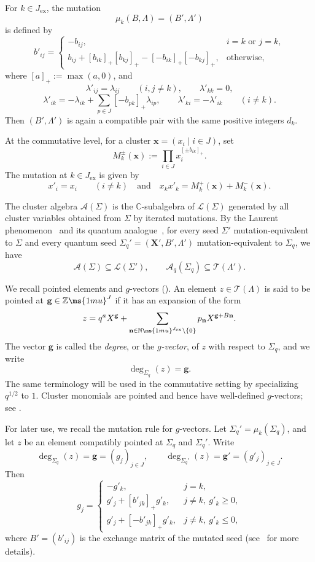 \documentclass[12pt, leqno]{amsart}
\numberwithin{equation}{section}
\theoremstyle{plain}
\theoremstyle{definition}
\newcommand{\seteq}{\mathbin{:=}}
\newcommand{\ex}{\mathrm{ex}}
\newcommand{\C}{\mathbb{C}}
\newcommand{\Z}{\mathbb{Z}\ms{1mu}}
\newcommand{\N}{\mathbb{N}\ms{1mu}}
\newcommand{\bfX}{\mathbf{X}}
\newcommand{\bfg}{\mathbf{g}}
\newcommand{\bfn}{\mathbf{n}}
\newcommand{\bfx}{\mathbf{x}}
\newcommand{\calA}{\mathcal{A}}
\newcommand{\calL}{\mathcal{L}}
\newcommand{\calT}{\mathcal{T}}
\newcommand{\qtq}[1][{and}]{\quad\text{{#1}}\quad}
\begin{document}
For $k\in J_{\ex}$, the mutation
\[
\mu_k(B,\Lambda)=(B',\Lambda')
\]
is defined by
\[
b'_{ij} =
\begin{cases}
-b_{ij}, & i=k \text{ or } j=k,\\
b_{ij}+[b_{ik}]_+[b_{kj}]_+ -[-b_{ik}]_+[-b_{kj}]_+, & \text{otherwise},
\end{cases}
\]
where $[a]_+\seteq\max(a,0)$, and
\[
\lambda'_{ij}=\lambda_{ij}\qquad(i,j\neq k),
\qquad\lambda'_{kk}=0,
\]
\[
\lambda'_{ik} = -\lambda_{ik} +\sum_{p\in J}[-b_{pk}]_+\lambda_{ip}, \qquad \lambda'_{ki}=-\lambda'_{ik}\qquad(i\neq k).
\]
Then $(B',\Lambda')$ is again a compatible pair with  the same positive integers $d_k$.

At the commutative level, for a cluster
$\bfx=(x_i\mid i\in J)$, set
\[
M_k^\pm(\bfx) \seteq \prod_{i\in J}x_i^{[\pm b_{ik}]_+}.
\]
The mutation at $k\in J_{\ex}$ is given by
\[
x'_i=x_i\qquad(i\neq k) \qtq x_kx'_k=M_k^+(\bfx)+M_k^-(\bfx).
\]

The cluster algebra $\calA(\Sigma)$ is the $\C$-subalgebra of
$\calL(\Sigma)$ generated by all cluster variables obtained from
$\Sigma$ by iterated mutations. By the Laurent phenomenon~\cite{FZ02}
and its quantum analogue~\cite{BZ05}, for every seed $\Sigma'$ mutation-equivalent
to $\Sigma$ and every quantum seed
$\Sigma_q'=(\bfX',B',\Lambda')$ mutation-equivalent to $\Sigma_q$, we have
\[
\calA(\Sigma)\subseteq\calL(\Sigma'),   \qquad   \calA_q(\Sigma_q)\subseteq\calT(\Lambda').
\]

We recall pointed elements and $g$-vectors (\cite{FZ07,Qin17}). An element
$z\in\calT(\Lambda)$ is said to be pointed at
$\bfg\in\Z^J$ if it has an expansion of the form
\begin{equation}\label{eq: pointed element}
z = q^a X^{\bfg} + \sum_{\bfn\in\N^{J_{\ex}}\setminus\{0\}} p_{\bfn}X^{\bfg+B\bfn}.
\end{equation}
The vector $\bfg$ is called the \emph{degree}, or the
\emph{$g$-vector}, of $z$ with respect to $\Sigma_q$,
and we write
\[
\deg_{\Sigma_q}(z)=\bfg.
\]
The same terminology will be used in the commutative setting by
specializing $q^{1/2}$ to $1$. Cluster monomials are pointed and hence
have well-defined $g$-vectors; see \cite[\S 5]{GHKK18}.

For later use, we recall the mutation rule for $g$-vectors.
Let $\Sigma_q'=\mu_k(\Sigma_q)$, and let $z$ be an element
compatibly pointed at $\Sigma_q$ and $\Sigma_q'$. Write
\[
\deg_{\Sigma_q}(z)=\bfg=(g_j)_{j\in J},
\qquad
\deg_{\Sigma_q'}(z)=\bfg'=(g'_j)_{j\in J}.
\] 
Then
\begin{equation}\label{eq: g-vector mutation}
g_j=
\begin{cases}
-g'_k, & j=k,\\[1mm]
g'_j+[b'_{jk}]_+g'_k,  & j\neq k,\ g'_k\geq0,\\[1mm]
g'_j+[-b'_{jk}]_+g'_k,  & j\neq k,\ g'_k\leq0,
\end{cases}
\end{equation}
where $B'=(b'_{ij})$ is the exchange matrix of the mutated seed
(see~\cite{FZ07,GHKK18,FHOO2} for more details).
\end{document}
